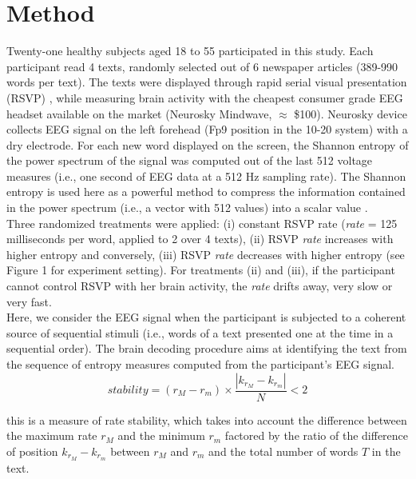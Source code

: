 \section*{Method}
\label{method}

Twenty-one healthy subjects aged 18 to 55 participated in this study. Each participant read 4 texts, randomly selected out of 6 newspaper articles (389-990 words per text). The texts were displayed through rapid serial visual presentation (RSVP) \cite{potter1984rapid,potter1975time}, while measuring brain activity with the cheapest consumer grade EEG headset available on the market (Neurosky Mindwave,  $\approx$ \$100). Neurosky device collects EEG signal on the left forehead (Fp9 position in the 10-20 system) with a dry electrode. For each new word displayed on the screen, the Shannon entropy of the power spectrum of the signal \cite{Tellenbach2009Beyond} was computed out of the last 512 voltage measures (i.e., one second of EEG data at a 512 Hz sampling rate). The Shannon entropy is used here as a powerful method to compress the information contained in the power spectrum (i.e., a vector with 512 values) into a scalar value \cite{ornstein1993entropy}.  \\

Three randomized treatments were applied:  (i) constant RSVP rate ({\it rate} = 125 milliseconds per word, applied to 2 over 4 texts), (ii) RSVP {\it rate}  increases with higher entropy and conversely, (iii) RSVP {\it rate}  decreases with higher entropy (see Figure 1 for experiment setting). For treatments (ii) and (iii), if the participant cannot control RSVP with her brain activity, the {\it rate} drifts away, very slow or very fast.\\

Here, we consider the EEG signal when the participant is subjected to a coherent source of sequential stimuli (i.e., words of a text presented one at the time in a sequential order). The brain decoding procedure aims at identifying the text from the sequence of entropy measures computed from the participant's EEG signal.\\



\begin{equation}
stability = (r_{M} - r_{m}) \times \frac{|k_{r_{M}} - k_{r_{m}}|}{N} < 2
\end{equation}

this is a measure of rate stability, which takes into account the difference between the maximum rate $r_M$ and the minimum $r_m$ factored by the ratio of the difference of position $k_{r_{M}} - k_{r_{m}}$ between $r_M$ and $r_m$ and the total number of words $T$ in the text.